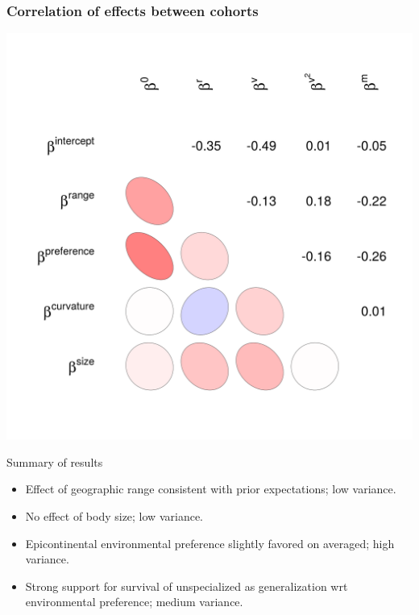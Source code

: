 \documentclass{beamer}
\begin{document}
\begin{frame}
  \frametitle{Correlation of effects between cohorts}

  \begin{center}
    \includegraphics[width = \textwidth,height = 0.9\textheight,keepaspectratio = true]{figure/wei_cor_heatmap}
  \end{center}
\end{frame}

\begin{frame}
  \begin{block}{Summary of results}
    \begin{itemize}
      \item Effect of geographic range consistent with prior expectations; low variance.
      \item No effect of body size; low variance.
      \item Epicontinental environmental preference slightly favored on averaged; high variance. 
      \item Strong support for survival of unspecialized as generalization wrt environmental preference; medium variance.
    \end{itemize}
  \end{block}
\end{frame}
\end{document}
